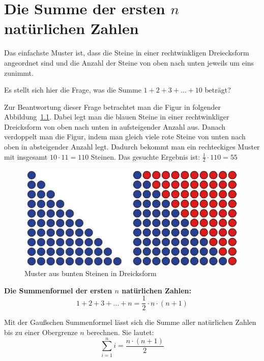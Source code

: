 %
%

\chapter{Die Summe der ersten $n$ natürlichen Zahlen}

Das einfachste Muster ist, dass die Steine in einer
rechtwinkligen Dreiecksform angeordnet sind und die
Anzahl der Steine von oben nach unten jeweils um eins
zunimmt.

Es stellt sich hier die Frage, was die Summe
$1+2+3+\dots+10$ beträgt?

Zur Beantwortung dieser Frage betrachtet man die Figur
in folgender Abbildung~\ref{fig:muster_gauss_summe}.
Dabei legt man die blauen Steine in 
einer rechtwinkliger Dreicksform von oben nach unten
in aufsteigender Anzahl aus. Danach verdoppelt man
die Figur, indem man gleich viele rote Steine von
unten nach oben in absteigender Anzahl legt.
Dadurch bekommt man ein rechteckiges Muster mit
insgesamt $10 \cdot 11 = 110$ Steinen.
Das gesuchte Ergebnis ist:
$\frac{1}{2} \cdot 110 = 55$

\begin{figure}[H]
  \centering
  \includegraphics[width=.5\linewidth]{./images/muster02.png}
  \caption[Muster aus bunten Steinen in Dreicksform]{Muster aus bunten Steinen in Dreicksform}
  \label{fig:muster_gauss_summe}
\end{figure}

\textbf{Die Summenformel der ersten $n$ natürlichen Zahlen:}
\[
  1 + 2 + 3 + \dots + n = \frac{1}{2} \cdot n \cdot (n+1) 
\]

Mit der Gaußschen Summenformel lässt sich die Summe aller natürlichen Zahlen bis zu einer Obergrenze $n$ berechnen. Sie lautet:
\[
  \sum_{i=1}^{n} i = \frac{n\cdot(n+1)}{2}
\]

